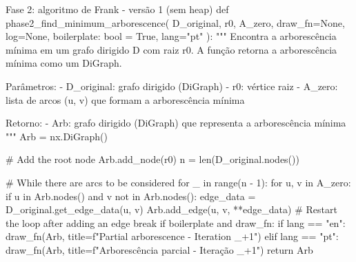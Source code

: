 \begin{pybox}{Fase 2: algoritmo de Frank - versão 1 (sem heap)}
	def phase2_find_minimum_arborescence(
	D_original, r0, A_zero, draw_fn=None, log=None, boilerplate: bool = True, lang="pt"
	):
	"""
	Encontra a arborescência mínima em um grafo dirigido D com raiz r0.
	A função retorna a arborescência mínima como um DiGraph.

	Parâmetros:
	- D_original: grafo dirigido (DiGraph)
	- r0: vértice raiz
	- A_zero: lista de arcos (u, v) que formam a arborescência mínima

	Retorno:
	- Arb: grafo dirigido (DiGraph) que representa a arborescência mínima
	"""
	Arb = nx.DiGraph()

	# Add the root node
	Arb.add_node(r0)
	n = len(D_original.nodes())

	# While there are arcs to be considered
	for _ in range(n - 1):
	for u, v in A_zero:
	if u in Arb.nodes() and v not in Arb.nodes():
	edge_data = D_original.get_edge_data(u, v)
	Arb.add_edge(u, v, **edge_data)
	# Restart the loop after adding an edge
	break
	if boilerplate and draw_fn:
	if lang == "en":
	draw_fn(Arb, title=f"Partial arborescence - Iteration {_+1}")
	elif lang == "pt":
	draw_fn(Arb, title=f"Arborescência parcial - Iteração {_+1}")
	return Arb
\end{pybox}

